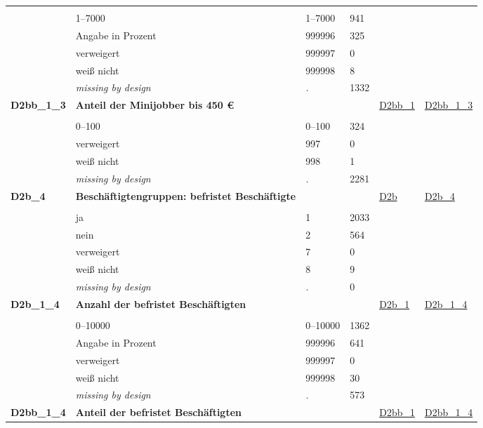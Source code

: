 \begin{longtable}{| L{2.45cm} | L{6cm} | C{1.5cm} | R{1cm} | C{2.25cm} | C{2.25cm} |}
   &  &  &  &  &  \\ 
   & 1--7000 & 1--7000 & 941 &  &  \\ 
   & Angabe in Prozent & 999996 & 325 &  &  \\ 
   & verweigert & 999997 & 0 &  &  \\ 
   & weiß nicht & 999998 & 8 &  &  \\ 
   & \textit{missing by design} & \textit{.} & 1332 &  &  \\ 
   \midrule
\textbf{D2bb\_1\_3}\label{var:D2bb:1:3} & \textbf{Anteil der Minijobber bis 450 €} &  &  & \hyperref[D2bb:1]{D2bb\_1} & \hyperref[var:suf:D2bb:1:3]{D2bb\_1\_3} \\ 
   &  &  &  &  &  \\ 
   & 0--100 & 0--100 & 324 &  &  \\ 
   & verweigert & 997 & 0 &  &  \\ 
   & weiß nicht & 998 & 1 &  &  \\ 
   & \textit{missing by design} & \textit{.} & 2281 &  &  \\ 
   \midrule
\textbf{D2b\_4}\label{var:D2b:4} & \textbf{Beschäftigtengruppen: befristet Beschäftigte} &  &  & \hyperref[D2b]{D2b} & \hyperref[var:suf:D2b:4]{D2b\_4} \\ 
   &  &  &  &  &  \\ 
   & ja & 1 & 2033 &  &  \\ 
   & nein & 2 & 564 &  &  \\ 
   & verweigert & 7 & 0 &  &  \\ 
   & weiß nicht & 8 & 9 &  &  \\ 
   & \textit{missing by design} & \textit{.} & 0 &  &  \\ 
   \midrule
\textbf{D2b\_1\_4}\label{var:D2b:1:4} & \textbf{Anzahl der befristet Beschäftigten} &  &  & \hyperref[D2b:1]{D2b\_1} & \hyperref[var:suf:D2b:1:4]{D2b\_1\_4} \\ 
   &  &  &  &  &  \\ 
   & 0--10000 & 0--10000 & 1362 &  &  \\ 
   & Angabe in Prozent & 999996 & 641 &  &  \\ 
   & verweigert & 999997 & 0 &  &  \\ 
   & weiß nicht & 999998 & 30 &  &  \\ 
   & \textit{missing by design} & \textit{.} & 573 &  &  \\ 
   \midrule
\textbf{D2bb\_1\_4}\label{var:D2bb:1:4} & \textbf{Anteil der befristet Beschäftigten} &  &  & \hyperref[D2bb:1]{D2bb\_1} & \hyperref[var:suf:D2bb:1:4]{D2bb\_1\_4} \\ 

\end{longtable}
